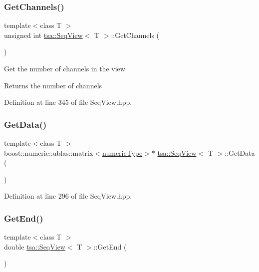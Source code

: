 \subsubsection{\texorpdfstring{Get\+Channels()}{GetChannels()}}
{\footnotesize\ttfamily template$<$class T $>$ \\
unsigned int \hyperlink{classtsa_1_1_seq_view}{tsa\+::\+Seq\+View}$<$ T $>$\+::Get\+Channels (\begin{DoxyParamCaption}{ }\end{DoxyParamCaption})\hspace{0.3cm}{\ttfamily [inline]}}

Get the number of channels in the view

\begin{DoxyReturn}{Returns}
the number of channels 
\end{DoxyReturn}


Definition at line 345 of file Seq\+View.\+hpp.

\mbox{\label{classtsa_1_1_seq_view_a64b132f96cd89cb36600ae172a823cbc}} 
\subsubsection{\texorpdfstring{Get\+Data()}{GetData()}}
{\footnotesize\ttfamily template$<$class T $>$ \\
boost\+::numeric\+::ublas\+::matrix$<$\hyperlink{classtsa_1_1_seq_view_a72b689db78d0feea3305e62cc3852a1d}{numeric\+Type}$>$$\ast$ \hyperlink{classtsa_1_1_seq_view}{tsa\+::\+Seq\+View}$<$ T $>$\+::Get\+Data (\begin{DoxyParamCaption}{ }\end{DoxyParamCaption})\hspace{0.3cm}{\ttfamily [inline]}}



Definition at line 296 of file Seq\+View.\+hpp.

\mbox{\label{classtsa_1_1_seq_view_a533806cacf5e6cf3cff6e35a6308ea34}} 
\subsubsection{\texorpdfstring{Get\+End()}{GetEnd()}}
{\footnotesize\ttfamily template$<$class T $>$ \\
double \hyperlink{classtsa_1_1_seq_view}{tsa\+::\+Seq\+View}$<$ T $>$\+::Get\+End (\begin{DoxyParamCaption}{ }\end{DoxyParamCaption})\hspace{0.3cm}{\ttfamily [inline]}}


